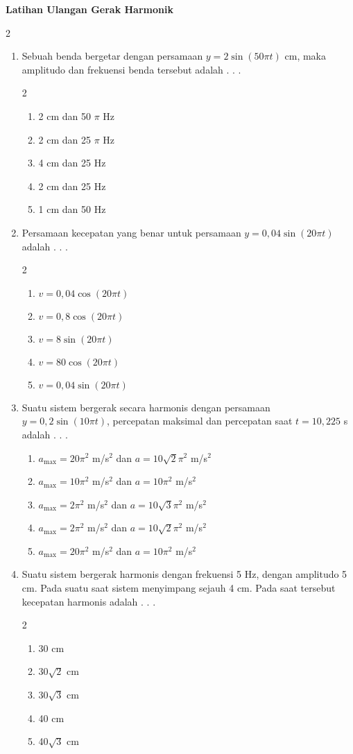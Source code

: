 \documentclass[10pt,a4paper]{extarticle}
\newcommand*\pilgan[1]{
\begin{enumerate}[label=\Alph*., itemsep=0pt,topsep=0pt,leftmargin=*,align=Center] #1 
\end{enumerate}}
\newcommand{\pilgani}[1]{                            \vspace{-0.3cm}\begin{multicols}{2}
 \begin{enumerate}[label=\Alph*., itemsep=0pt,topsep=0pt,leftmargin=*,align=Center]#1                     \end{enumerate}
 \phantom{ini cuma sapi, wedus, dan ayam}
 \end{multicols}}
\begin{document}
 \textbf{Latihan Ulangan Gerak Harmonik} \phantom{ini nama siswa yang aaamengerjakan soal kuis ini }  

\begin{multicols*}{2}\raggedcolumns

\begin{enumerate}
\item Sebuah benda bergetar dengan persamaan $y=2\sin(50\pi t)$ cm, maka amplitudo dan frekuensi benda tersebut adalah . . .
\pilgani{
   \item 2 cm dan 50 $\pi$ Hz
   \item 2 cm dan 25 $\pi$ Hz
   \item 4 cm dan 25 Hz
   \item 2 cm dan 25 Hz
   \item 1 cm dan 50 Hz}
\vspace{2cm}

\item Persamaan kecepatan yang benar untuk persamaan $y=0,04 \sin (20\pi t)$ adalah . . .
\pilgani{
   \item $v=0,04 \cos (20\pi t)$
   \item $v=0,8 \cos (20\pi t)$
   \item $v=8 \sin (20\pi t)$
   \item $v=80 \cos (20\pi t)$
   \item $v=0,04 \sin (20\pi t)$}
\vspace{2cm}

\item Suatu sistem bergerak secara harmonis dengan persamaan $y=0,2 \sin (10\pi t)$, percepatan maksimal dan percepatan saat $t = 10,225$ s adalah . . .
\pilgan{
   \item $a_\text{max} = 20 \pi^2$ m/s$^2$ dan $a=10\sqrt{2}\pi^2$ m/s$^2$ 
   \item $a_\text{max} = 10 \pi^2$ m/s$^2$ dan $a=10\pi^2$ m/s$^2$ 
   \item $a_\text{max} = 2 \pi^2$ m/s$^2$ dan $a=10\sqrt{3}\pi^2$ m/s$^2$ 
   \item $a_\text{max} = 2 \pi^2$ m/s$^2$  dan $a=10\sqrt{2}\pi^2$ m/s$^2$ 
   \item $a_\text{max} = 20 \pi^2$ m/s$^2$ dan $a=10\pi^2$ m/s$^2$ }
\vspace{3cm}

\item Suatu sistem bergerak harmonis dengan frekuensi 5 Hz, dengan amplitudo 5 cm. Pada suatu saat sistem menyimpang sejauh 4 cm. Pada saat tersebut kecepatan harmonis adalah . . . 
\pilgani{
   \item 30 cm
   \item 30$\sqrt{2}$ cm
   \item 30$\sqrt{3}$ cm
   \item 40 cm
   \item 40$\sqrt{3}$ cm
}
\vspace{4cm}



\end{enumerate}
\end{multicols*}
\end{document}
